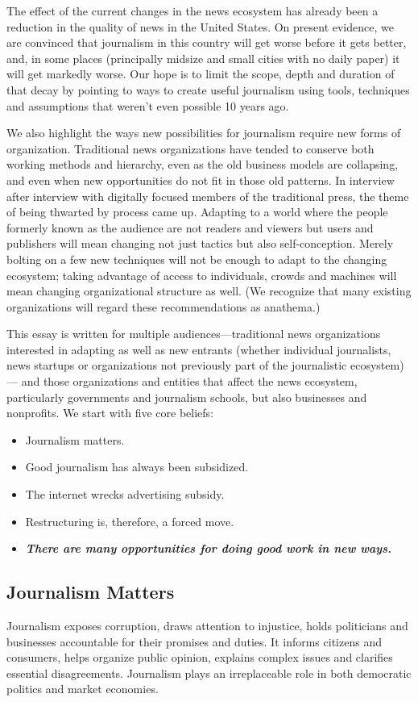 The effect of the current changes in the news ecosystem has already been a
reduction in the quality of news in the United States. On present evidence, we
are convinced that journalism in this country will get worse before it gets better,
and, in some places (principally midsize and small cities with no daily paper) it
will get markedly worse. Our hope is to limit the scope, depth and duration of
that decay by pointing to ways to create useful journalism using tools, techniques
and assumptions that weren’t even possible 10 years ago.

We also highlight the ways new possibilities for journalism require new forms of
organization. Traditional news organizations have tended to conserve both working
methods and hierarchy, even as the old business models are collapsing, and
even when new opportunities do not fit in those old patterns. In interview after
interview with digitally focused members of the traditional press, the theme of
being thwarted by process came up. Adapting to a world where the people formerly
known as the audience are not readers and viewers but users and publishers
will mean changing not just tactics but also self-conception. Merely bolting
on a few new techniques will not be enough to adapt to the changing ecosystem;
taking advantage of access to individuals, crowds and machines will mean changing
organizational structure as well. (We recognize that many existing organizations 
will regard these recommendations as anathema.)

This essay is written for multiple audiences—traditional news organizations
interested in adapting as well as new entrants (whether individual journalists,
news startups or organizations not previously part of the journalistic ecosystem)—
and those organizations and entities that affect the news ecosystem, particularly
governments and journalism schools, but also businesses and nonprofits.
We start with five core beliefs:
\begin{itemize}
\item Journalism matters.
\item Good journalism has always been subsidized.
\item The internet wrecks advertising subsidy.
\item Restructuring is, therefore, a forced move.
\item \textbf{\emph{There are many opportunities for doing good work in new ways.}}
\end{itemize}

\subsection{Journalism Matters}
Journalism exposes corruption, draws attention to injustice, holds politicians
and businesses accountable for their promises and duties. It informs citizens and
consumers, helps organize public opinion, explains complex issues and clarifies
essential disagreements. Journalism plays an irreplaceable role in both democratic
politics and market economies.

